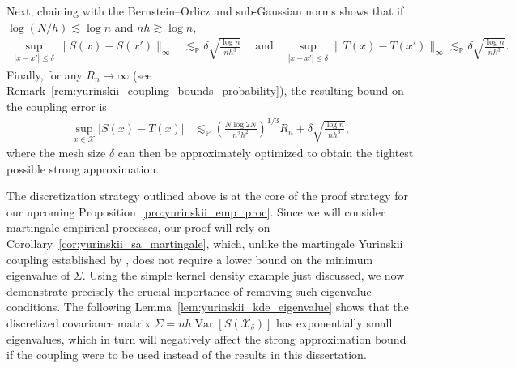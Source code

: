 \documentclass[11pt,lof]{puthesis}
\renewcommand{\P}{\ensuremath{\mathbb{P}}}
\newcommand{\cX}{\ensuremath{\mathcal{X}}}
\DeclareMathOperator{\Var}{Var}
\theoremstyle{break}
\theoremstyle{proof}
\begin{document}
Next, chaining with the Bernstein--Orlicz and sub-Gaussian norms
\citep[Section~2.2]{van1996weak} shows that if
$\log(N/h) \lesssim \log n$ and $n h \gtrsim \log n$,
%
\begin{align*}
  \sup_{|x-x'| \leq \delta}
  \big\|S(x) - S(x') \big\|_\infty
  &\lesssim_\P
  \delta
  \sqrt{\frac{\log n}{n h^3}} \ \quad\text{and}\quad
  \sup_{|x-x'| \leq \delta}
  \big\|T(x) - T(x')\big\|_\infty
  \lesssim_\P
  \delta
  \sqrt{\frac{\log n}{n h^3}}.
\end{align*}
%
Finally, for any $R_n\to\infty$
(see Remark~\ref{rem:yurinskii_coupling_bounds_probability}),
the resulting bound on the coupling error is
%
\begin{align*}
  \sup_{x \in \cX}
  \big| S(x) - T(x) \big|
  &\lesssim_\P
  \left( \frac{N \log 2N}{n^2 h^2} \right)^{1/3} R_n
  + \delta \sqrt{\frac{\log n}{n h^3}},
\end{align*}
%
where the mesh size $\delta$ can then be approximately
optimized to obtain the tightest possible strong approximation.

The discretization strategy outlined above is at the core of the proof strategy
for our upcoming Proposition~\ref{pro:yurinskii_emp_proc}. Since we will
consider martingale empirical processes, our proof will rely on
Corollary~\ref{cor:yurinskii_sa_martingale}, which, unlike the martingale
Yurinskii coupling established by \citet{li2020uniform}, does not require a
lower bound on the minimum eigenvalue of $\Sigma$. Using the simple kernel
density example just discussed, we now demonstrate precisely the crucial
importance of removing such eigenvalue conditions. The following
Lemma~\ref{lem:yurinskii_kde_eigenvalue} shows that the discretized covariance
matrix $\Sigma = n h\Var[S(\cX_\delta)]$ has exponentially small eigenvalues,
which in turn will negatively affect the strong approximation bound if the
\citet{li2020uniform} coupling were to be used instead of the results in this
dissertation.
\end{document}
